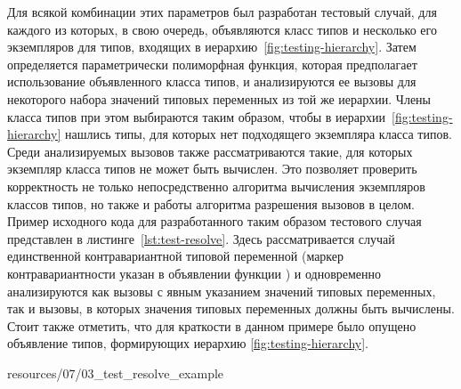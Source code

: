 Для всякой комбинации этих параметров был разработан тестовый случай, для каждого из которых, в свою очередь, объявляются класс типов и несколько его экземпляров для типов, входящих в иерархию~\ref{fig:testing-hierarchy}. Затем определяется параметрически полиморфная функция, которая предполагает использование объявленного класса типов, и анализируются ее вызовы для некоторого набора значений типовых переменных из той же иерархии. Члены класса типов при этом выбираются таким образом, чтобы в иерархии~\ref{fig:testing-hierarchy} нашлись типы, для которых нет подходящего экземпляра класса типов. Среди анализируемых вызовов также рассматриваются такие, для которых экземпляр класса типов не может быть вычислен. Это позволяет проверить корректность не только непосредственно алгоритма вычисления экземпляров классов типов, но также и работы алгоритма разрешения вызовов в целом. Пример исходного кода для разработанного таким образом тестового случая представлен в листинге~\ref{lst:test-resolve}. Здесь рассматривается случай единственной контравариантной типовой переменной (маркер контравариантности указан в объявлении функции ) и одновременно анализируются как вызовы с явным указанием значений типовых переменных, так и вызовы, в которых значения типовых переменных должны быть вычислены. Стоит также отметить, что для краткости в данном примере было опущено объявление типов, формирующих иерархию \ref{fig:testing-hierarchy}. 


{resources/07/03_test_resolve_example}  

